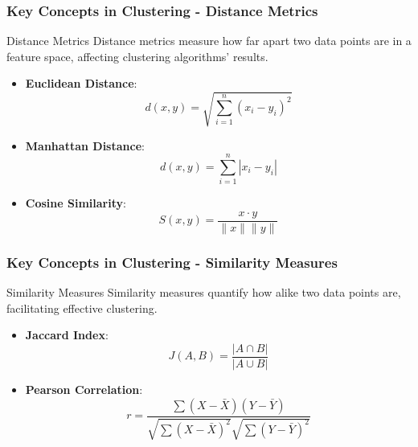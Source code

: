 \documentclass[aspectratio=169]{beamer}
\begin{document}
\begin{frame}[fragile]
    \frametitle{Key Concepts in Clustering - Distance Metrics}
    \begin{block}{Distance Metrics}
        Distance metrics measure how far apart two data points are in a feature space, affecting clustering algorithms’ results.
    \end{block}
    \begin{itemize}
        \item \textbf{Euclidean Distance}:
            \begin{equation}
            d(x, y) = \sqrt{\sum_{i=1}^{n} (x_i - y_i)^2}
            \end{equation}
        \item \textbf{Manhattan Distance}:
            \begin{equation}
            d(x, y) = \sum_{i=1}^{n} |x_i - y_i|
            \end{equation}
        \item \textbf{Cosine Similarity}:
            \begin{equation}
            S(x, y) = \frac{x \cdot y}{\|x\| \|y\|}
            \end{equation}
    \end{itemize}
\end{frame}

\begin{frame}[fragile]
    \frametitle{Key Concepts in Clustering - Similarity Measures}
    \begin{block}{Similarity Measures}
        Similarity measures quantify how alike two data points are, facilitating effective clustering.
    \end{block}
    \begin{itemize}
        \item \textbf{Jaccard Index}:
            \begin{equation}
            J(A, B) = \frac{|A \cap B|}{|A \cup B|}
            \end{equation}
        \item \textbf{Pearson Correlation}:
            \begin{equation}
            r = \frac{\sum (X - \bar{X})(Y - \bar{Y})}{\sqrt{\sum (X - \bar{X})^2} \sqrt{\sum (Y - \bar{Y})^2}}
            \end{equation}
    \end{itemize}
\end{frame}
\end{document}
